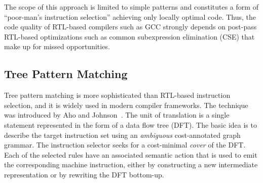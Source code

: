 The scope of this approach is limited to simple patterns and
constitutes a form of ``poor-man's instruction selection'' achieving
only locally optimal code. Thus, the code quality of RTL-based
compilers such as GCC strongly depends on post-pass RTL-based
optimizations such as common subexpression elimination (CSE) that make
up for missed opportunities.
\subsection{Tree Pattern Matching}
\label{sec:tpm}
Tree pattern matching is more sophisticated than RTL-based instruction
selection, and it is widely used in modern compiler frameworks. The
technique was introduced by Aho and Johnson~\cite{aj:76}. The unit of
translation is a single statement represented in the form of a data
flow tree (DFT). The basic idea is to describe the target instruction
set using an \emph{ambiguous} cost-annotated graph grammar. The
instruction selector seeks for a cost-minimal \emph{cover} of the
DFT. Each of the selected rules have an associated semantic action
that is used to emit the corresponding machine instruction, either by
constructing a new intermediate representation or by rewriting the DFT
bottom-up.
